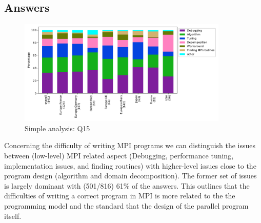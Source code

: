 
\subsection{Answers}


\begin{figure}[htb]
\begin{center}
\includegraphics[width=10cm]{../pdfs/Q15.pdf}
\caption{Simple analysis: Q15}
\label{fig:Q15}
\end{center}
\end{figure}

Concerning the difficulty of writing MPI programs we can distinguish the issues
between (low-level) MPI related aspect (Debugging, performance tuning,
implementation issues, and finding routines) with higher-level issues close to
the program design (algorithm and domain decomposition). The former set of
issues is largely dominant with (501/816) 61\% of the answers. This outlines
that the difficulties of writing a correct program in MPI is more related to the
the programming model and the standard that the design of the parallel program itself. 

